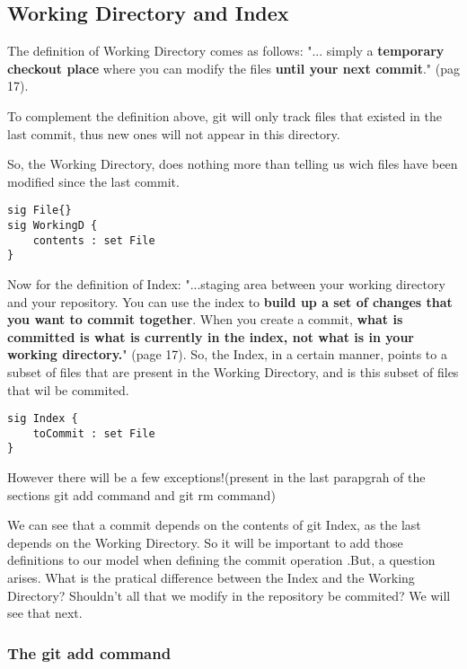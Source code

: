 \subsection{Working Directory and Index}

The definition of Working Directory comes as follows:
"... simply a {\bf temporary checkout place} where you can 
modify the files {\bf until your next commit}."
\cite{gitComm} (pag 17). \par

To complement the definition above, git will only
track files that existed in the last commit, thus
new ones will not appear in this directory. \par 
So,
the Working Directory, does nothing more than telling
us wich files have been modified since the last commit.

\begin{lstlisting}
sig File{}
sig WorkingD {
	contents : set File
}
\end{lstlisting}

Now for the definition of Index:
"...staging area between your working directory and your
repository. You can use the index to {\bf build up a set of 
changes that you want to commit together}. When you create
a commit, {\bf what is committed is what is currently in the
index, not what is in your working directory.}"
\cite{gitComm} (page 17). So, the Index, in a certain
manner, points to a subset
of files that are present in the Working Directory, and
is this subset of files that wil be commited. 

\begin{lstlisting}
sig Index {
	toCommit : set File
}
\end{lstlisting}

However
there will be a few exceptions!(present in the last parapgrah of the sections
git add command and git rm command)\par

We can see  
that a commit depends on the contents of git Index, as the
last depends on the Working Directory. So it will be important
to add those definitions to our model when defining the commit operation
.But, a question arises.
What is the pratical difference between the Index and the Working
Directory? Shouldn't all that we modify in the repository be 
commited? We will see that next. 

\subsubsection{The git add command}

